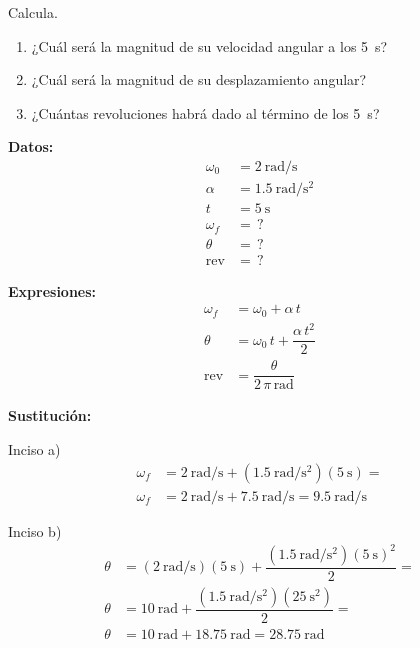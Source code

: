 \documentclass[14pt]{extarticle}
\begin{document}
\begin{enumerate}
Calcula.
\begin{enumerate}[label=\alph*)]
\item ¿Cuál será la magnitud de su velocidad angular a los \SI{5}{\second}?
\item ¿Cuál será la magnitud de su desplazamiento angular?
\item ¿Cuántas revoluciones habrá dado al término de los \SI{5}{\second}?
\end{enumerate}

\begin{minipage}[t]{0.4\linewidth}
\textbf{Datos:}
\begin{align*}
\omega_{0} &= \SI{2}{\radian\per\second} \\
\alpha &= \SI{1.5}{\radian\per\square\second} \\
t &= \SI{5}{\second} \\
\omega_{f} &= \, ? \\
\theta &= \, ? \\
\text{rev} &= \, ?
\end{align*}
\end{minipage}
\begin{minipage}[t]{0.4\linewidth}
\textbf{Expresiones:}
\begin{align*}
\omega_{f} &= \omega_{0} + \alpha \, t \\
\theta &= \omega_{0} \, t + \dfrac{\alpha \, t^{2}}{2} \\
\text{rev} &= \dfrac{\theta}{2 \, \pi \, \unit{\radian}}
\end{align*}
\end{minipage}

\textbf{Sustitución:}

Inciso a)
\begin{align*}
\omega_{f} &= \SI[per-mode=fraction]{2}{\radian\per\second} + \left( \SI[per-mode=fraction]{1.5}{\radian\per\square\second} \right) \left( \SI[per-mode=fraction]{5}{\second} \right) = \\[0.5em]
\omega_{f} &= \SI[per-mode=fraction]{2}{\radian\per\second} + \SI[per-mode=fraction]{7.5}{\radian\per\second} = \SI[per-mode=fraction]{9.5}{\radian\per\second}
\end{align*}

Inciso b)
\begin{align*}
\theta &= \left( \SI[per-mode=fraction]{2}{\radian\per\second} \right) \left( \SI{5}{\second} \right) + \dfrac{\displaystyle \left( \SI[per-mode=fraction]{1.5}{\radian\per\square\second} \right)\left( \SI{5}{\second} \right)^{2}}{2} = \\[0.5em]
\theta &= \SI[per-mode=fraction]{10}{\radian} + \dfrac{ \displaystyle \left( \SI[per-mode=fraction]{1.5}{\radian\per\square\second} \right)\left( \SI{25}{\square\second} \right) }{2} = \\[0.5em]
\theta &= \SI{10}{\radian} + \SI{18.75}{\radian} = \SI{28.75}{\radian}
\end{align*}


\end{enumerate}
\end{document}
